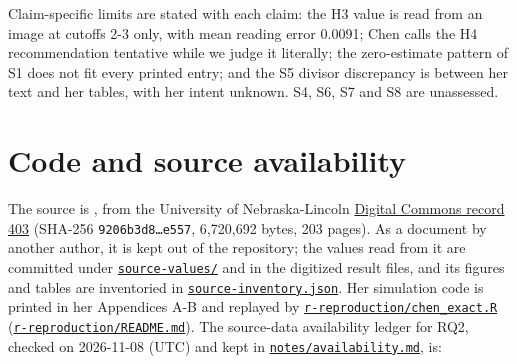 Claim-specific limits are stated with each claim: the H3 value is read from an image at cutoffs 2-3 only, with mean reading error 0.0091; Chen calls the H4 recommendation tentative while we judge it literally; the zero-estimate pattern of S1 does not fit every printed entry; and the S5 divisor discrepancy is between her text and her tables, with her intent unknown. S4, S6, S7 and S8 are unassessed.

\section{Code and source availability}\label{sec:availability}

The source is \citet{chen2021}, from the University of Nebraska-Lincoln \href{https://digitalcommons.unl.edu/cehsdiss/403/}{Digital Commons record 403} (SHA-256 \texttt{9206b3d8\ldots e557}, 6,720,692 bytes, 203 pages). As a document by another author, it is kept out of the repository; the values read from it are committed under \href{https://github.com/alectionary/vibe-math/tree/master/formalization/chen-rdd-mediation/source-values}{\nolinkurl{source-values/}} and in the digitized result files, and its figures and tables are inventoried in \href{https://github.com/alectionary/vibe-math/blob/master/formalization/chen-rdd-mediation/source-inventory.json}{\nolinkurl{source-inventory.json}}. Her simulation code is printed in her Appendices A-B and replayed by \href{https://github.com/alectionary/vibe-math/blob/master/formalization/chen-rdd-mediation/r-reproduction/chen_exact.R}{\nolinkurl{r-reproduction/chen_exact.R}} (\href{https://github.com/alectionary/vibe-math/blob/master/formalization/chen-rdd-mediation/r-reproduction/README.md}{\nolinkurl{r-reproduction/README.md}}). The source-data availability ledger for RQ2, checked on 2026-11-08 (UTC) and kept in \href{https://github.com/alectionary/vibe-math/blob/master/formalization/chen-rdd-mediation/notes/availability.md}{\nolinkurl{notes/availability.md}}, is:

